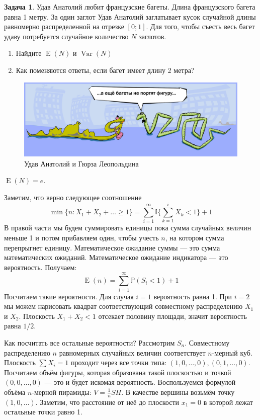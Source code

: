 \documentclass[nobib]{tufte-handout}
\theoremstyle{definition}
\newtheorem{problem}{Задача}
\DeclareMathOperator{\Var}{Var}
\DeclareMathOperator{\E}{E}
\renewcommand{\P}{\mathbb{P}}
\newcommand{\I}{\mathbb{I}} %
\begin{document}
\begin{problem}
Удав Анатолий любит французские багеты. Длина французского багета равна 1 метру. За один заглот Удав Анатолий заглатывает кусок случайной длины равномерно распределенной на отрезке $[0;1]$. Для того, чтобы съесть весь багет удаву потребуется случайное количество $N$ заглотов.
\begin{enumerate}
\item Найдите $\E(N)$ и $\Var(N)$
\item Как поменяются ответы, если багет имеет длину 2 метра?
\end{enumerate}

\begin{figure}
  \includegraphics[width=17cm]{images/python_anatoliy.jpg}
  \caption{Удав Анатолий и Гюрза Леопольдина}
\end{figure}


\begin{sol}
$\E(N)=e$.

Заметим, что верно следующее соотношение
\[
\min \{n : X_1 + X_2 + \ldots \geq 1 \} = \sum_{i = 1}^{\infty} \I \{\sum_{k = 1}^i X_k < 1\} + 1
\]
В правой части мы будем суммировать единицы пока сумма случайных величин меньше 1 и потом прибавляем один, чтобы учесть $n$, на котором сумма перепрыгнет единицу. Математическое ожидание суммы — это сумма математических ожиданий. Математическое ожидание индикатора — это вероятность. Получаем:
\[
\E(n) =  \sum_{i = 1}^{\infty} \P (S_i < 1) + 1
\]
Посчитаем такие вероятности. Для случая $i = 1$ вероятность равна 1. При $i = 2$ мы можем нарисовать квадрат соответствующий совместному распределению $X_1$ и $X_2$. Плоскость $X_1 + X_2 < 1$ отсекает половину площади, значит вероятность равна $1/2$.

Как посчитать все остальные вероятности? Рассмотрим $S_n$. Совместному распределению $n$ равномерных случайных величин соответствует $n$-мерный куб. Плоскость $\sum X_i = 1$ проходит через все точки типа: $(1, 0, \ldots, 0), (0, 1, \ldots, 0)$. Посчитаем объём фигуры, которая образована такой плоскостью и точкой $(0, 0, \ldots, 0)$ — это и будет искомая вероятность. Воспользуемся формулой объёма $n$-мерной пирамиды: $V = \frac{1}{n}SH$. В качестве вершины возьмём точку $(1,0,\ldots)$. Заметим, что расстояние от неё до плоскости $x_1 = 0$ в которой лежат остальные точки равно 1.


\end{sol}
\end{problem}
\end{document}
